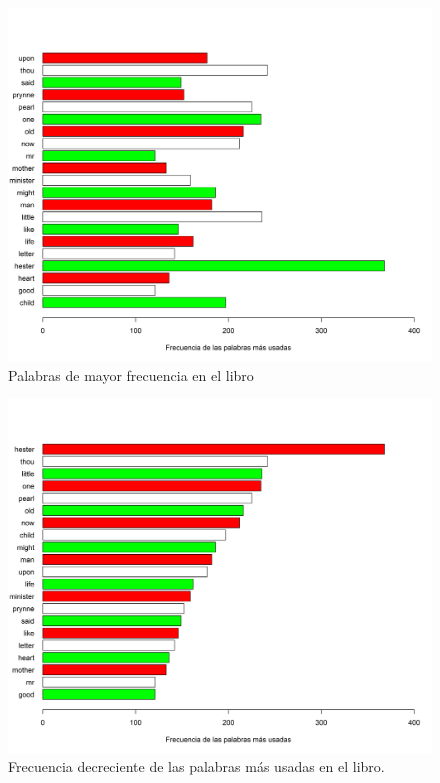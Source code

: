 \documentclass[fontsize=12pt]{article}
\begin{document}
\begin{figure}
\centering
\includegraphics[scale=0.6]{Figures/palabrasFiltradas.png}
\caption{Palabras de mayor frecuencia en el libro}
\label{palabrasfiltradas}
\end{figure}

\begin{figure}
\centering
\includegraphics[scale=0.6]{Figures/palabrasFiltradasDecr.png}
\caption{Frecuencia decreciente de las palabras más usadas en el libro.}
\label{palabrasfiltradasdec}
\end{figure}
\end{document}

